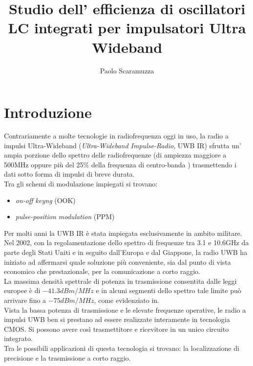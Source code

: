 \documentclass[a4paper, 12pt]{memoir}
\author{Paolo Scaramuzza}
\title{Studio dell' efficienza di oscillatori LC integrati per impulsatori 
	Ultra Wideband}
\date{} %
\begin{document}

\cleardoublepage{}
\newpage
{} %
\begin{vplace}[0.7]
	
\end{vplace}
\cleardoublepage{}
\newpage
\tableofcontents

\chapter{Introduzione}
Contrariamente a molte tecnologie in radiofrequenza oggi in uso, la radio a
impulsi Ultra-Wideband (\emph{Ultra-Wideband Impulse-Radio}, UWB IR)
sfrutta un' ampia porzione dello spettro delle radiofrequenze (di ampiezza
maggiore a 500MHz oppure più del 25\% della frequenza di centro-banda
\cite{Neviani12}) trasmettendo i dati sotto forma di impulsi di breve durata.\\
Tra gli schemi di modulazione impiegati si trovano: 
\begin{itemize}
	\item \emph{on-off keyng} (OOK)
	\item \emph{pulse-position modulation} (PPM)
\end{itemize}

Per molti anni la UWB IR è stata impiegata esclusivamente in ambito
militare. Nel 2002, con la regolamentazione dello spettro di frequenze tra 3.1 
e 10.6GHz da parte degli Stati Uniti e in seguito dall'Europa e dal Giappone,
la radio UWB ha iniziato ad affermarsi quale soluzione più conveniente, sia dal
punto di vista economico che prestazionale, per la comunicazione a corto raggio.
\\La massima densità spettrale di potenza in trasmissione consentita dalle
leggi europee è di $ -41.3 dBm/MHz $ e in alcuni segmenti dello spettro tale
limite può arrivare fino a $ -75 dBm/MHz $, come evidenziato in\cite{Hirt07}.\\
Vista la bassa potenza di trasmissione e le elevate frequenze operative,
le radio a impulsi UWB ben si prestano ad essere realizzate interamente in
tecnologia CMOS.\@
Si possono avere così trasmettitore e ricevitore in un unico circuito integrato.
\\Tra le possibili applicazioni di questa tecnologia si trovano: la
localizzazione di precisione e la trasmissione a corto raggio.
\end{document}
